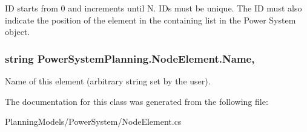 ID starts from 0 and increments until N. ID\textquotesingle{}s must be unique. The ID must also indicate the position of the element in the containing list in the Power System object. 
\subsubsection[{\texorpdfstring{Name}{Name}}]{\setlength{\rightskip}{0pt plus 5cm}string Power\+System\+Planning.\+Node\+Element.\+Name\hspace{0.3cm}{\ttfamily [get]}, {\ttfamily [set]}}\hypertarget{class_power_system_planning_1_1_node_element_a07a0b254e0ac3b4b97dd45bde0a44291}{}\label{class_power_system_planning_1_1_node_element_a07a0b254e0ac3b4b97dd45bde0a44291}


Name of this element (arbitrary string set by the user). 



The documentation for this class was generated from the following file\+:\begin{DoxyCompactItemize}
\item 
Planning\+Models/\+Power\+System/Node\+Element.\+cs\end{DoxyCompactItemize}
